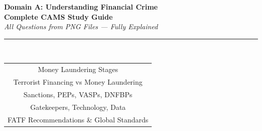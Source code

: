 \documentclass[12pt,aspectratio=169]{beamer}
\begin{document}
	
	\begin{frame}
		\centering
		\vspace{1.2cm}
		{\fontsize{22}{26}\selectfont \textbf{Domain A: Understanding Financial Crime}}\\[0.3cm]
		{\fontsize{16}{19}\selectfont \textbf{Complete CAMS Study Guide}}\\[0.5cm]
		{\fontsize{11}{13}\selectfont \textit{All Questions from PNG Files — Fully Explained}}\\[0.3cm]
		\rule{5cm}{0.5pt}\\[0.2cm]
		{\fontsize{9}{11}\selectfont 
			\begin{tabular}{c}
				Money Laundering Stages \\
				Terrorist Financing vs Money Laundering \\
				Sanctions, PEPs, VASPs, DNFBPs \\
				Gatekeepers, Technology, Data \\
				FATF Recommendations \& Global Standards
			\end{tabular}
		}
		\vspace{0.5cm}
	\end{frame}
	
\end{document}
